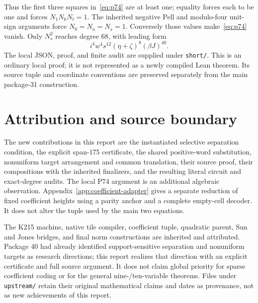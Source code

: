 \documentclass[11pt,letterpaper]{article}
\theoremstyle{definition}\newtheorem{definition}[theorem]{Definition}
\newcommand{\file}[1]{{\small\nolinkurl{#1}}}
\begin{document}
Thus the first three squares in~\eqref{eq:p74} are at least one; equality
forces each to be one and forces $N_1N_kN_t=1$. The inherited negative
Pell and modulo-four unit-sign arguments force $N_0=N_a=N_s=1$.
Conversely those values make~\eqref{eq:p74} vanish. Only $N_s^2$ reaches
degree 68, with leading form
\[
i^4w^4s^{12}(\eta+\zeta)^8(\beta J)^{40}.
\]
The local JSON, proof, and finite audit are supplied under \file{short/}.
This is an ordinary local proof; it is not represented as a newly compiled
Lean theorem. Its source tuple and coordinate conventions are preserved
separately from the main package-31 construction.



\section{Attribution and source boundary}
\label{app:attribution}

The new contributions in this report are the instantiated selective
separation condition, the explicit span-175 certificate, the shared
positive-word substitution, nonuniform target arrangement and common
translation, their source proof, their compositions with the inherited
finalizers, and the resulting literal circuit and exact-degree audits.
The local P74 argument is an additional algebraic observation.
Appendix~\ref{app:coefficient-adapter} gives a separate reduction of fixed
coefficient heights using a parity anchor and a complete empty-cell decoder.
It does not alter the tuple used by the main two equations.

The K215 machine, native tile compiler, coefficient tuple, quadratic
parent, Sun and Jones bridges, and final norm constructions are inherited
and attributed. Package 40 had already identified support-sensitive
separation and nonuniform targets as research directions; this report
realizes that direction with an explicit certificate and full source
argument. It does not claim global priority for sparse coefficient coding
or for the general nine-/ten-variable theorems. Files under
\file{upstream/} retain their original mathematical claims and dates as
provenance, not as new achievements of this report.
\end{document}
